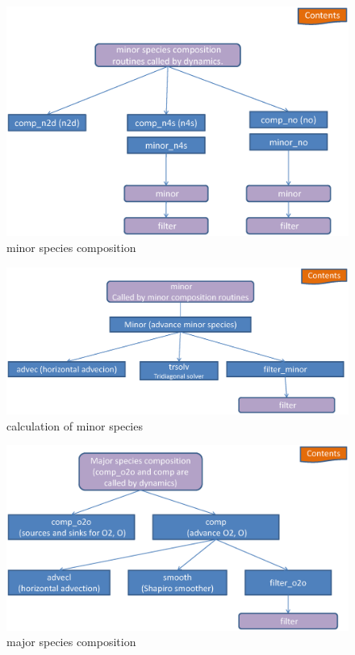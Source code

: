 %
\begin{figure}
  \centering
  \includegraphics[scale=0.7,angle=-90.]{./tex_plot/code_9.ps}
  \caption{minor species composition}
   \label{fig:code_9}
\end{figure}
%
\begin{figure}
  \centering
  \includegraphics[scale=0.7,angle=-90.]{./tex_plot/code_10.ps}
  \caption{calculation of minor species}
   \label{fig:code_10}
\end{figure}
%
\begin{figure}
  \centering
  \includegraphics[scale=0.7,angle=-90.]{./tex_plot/code_11.ps}
  \caption{major species composition}
   \label{fig:code_11}
\end{figure}

